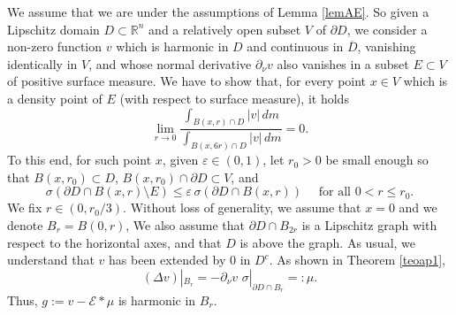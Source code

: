 \documentclass[11pt]{amsart}
\newcommand{\R}{{\mathbb R}}       %
\newcommand{\EE}{{\mathcal E}}
\newcommand{\ve}{{\varepsilon}}
\theoremstyle{definition}
\theoremstyle{remark}
\numberwithin{equation}{section}
\begin{document}
We assume that we are under the assumptions of Lemma \ref{lemAE}. So given a Lipschitz domain
 $D\subset\R^n$ and a relatively open subset $V$ of $\partial D$,  we consider 
  a non-zero function $v$ which is harmonic in $D$ and continuous in $\overline D$, vanishing identically
in $V$, and whose normal derivative $\partial_\nu v$ also vanishes in a subset $E\subset V$ of positive
surface measure. We have to show that, for every point $x\in V$ which is a density point of $E$ (with respect to surface measure),
it holds
\begin{equation}\label{eqnodob'}
\lim_{r\to 0} \frac{\int_{B(x,r)\cap D} |v|\,dm}{\int_{B(x,6r)\cap D} |v|\,dm} = 0.
\end{equation}
To this end, for such point $x$, given $\ve\in (0,1)$, let $r_0>0$ be small enough so that $B(x,r_0)\subset D$, 
$B(x,r_0)\cap \partial D\subset V$, and
$$\sigma(\partial D\cap B(x,r)\setminus E)\leq \ve\,\sigma(\partial D\cap B(x,r))\quad \mbox{ for all $0<r\leq r_0$.}$$
We fix $r\in (0,r_0/3)$.
Without loss of generality, we assume that $x=0$ and we denote $B_r=B(0,r)$, We also assume
that $\partial D\cap B_{2r}$ is a Lipschitz graph with respect to the horizontal axes, and that $D$ is above the graph. As usual, we understand that $v$ has been extended by $0$ in $D^c$.
As shown in Theorem \ref{teoap1},
$$(\Delta v)|_{B_r} = -\partial_\nu v\,\,\sigma|_{\partial D \cap B_r} =:\mu.$$
Thus, 
$g:=v - \EE *\mu$ is harmonic in $B_r.$ 
\end{document}
